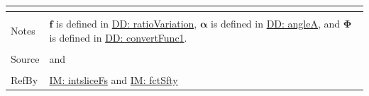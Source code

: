 \documentclass[12pt]{article}
\begin{document}
\begin{minipage}{\textwidth}
\begin{tabular}{>{\raggedright}p{}>{\raggedright\arraybackslash}p{}}
\begin{symbDescription}
                        \end{symbDescription}
          \\ \midrule \\
          Notes & $\mathbf{f}$ is defined in \hyperref[DD:ratioVariation]{DD: ratioVariation}, $\mathbf{α}$ is defined in \hyperref[DD:angleA]{DD: angleA}, and $\mathbf{Φ}$ is defined in \hyperref[DD:convertFunc1]{DD: convertFunc1}.
          \\ \midrule \\
          Source & \cite{chen2005} and \cite{karchewski2012}
          \\ \midrule \\
          RefBy & \hyperref[IM:intsliceFs]{IM: intsliceFs} and \hyperref[IM:fctSfty]{IM: fctSfty}
          \\ \bottomrule
          \end{tabular}
          \end{minipage}
\par~
\end{document}
